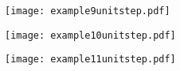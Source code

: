 \documentclass[grid, poker_portrait]{flashcards}
\begin{document}
    \begin{flashcard}{ \begin{dmath*}  \end{dmath*} }
        \texttt{[image: example9unitstep.pdf]}
    \end{flashcard}

    \begin{flashcard}{ \begin{dmath*}  \end{dmath*} }
        \texttt{[image: example10unitstep.pdf]}
    \end{flashcard}

    \begin{flashcard}{ \begin{dmath*}  \end{dmath*} }
        \texttt{[image: example11unitstep.pdf]}
    \end{flashcard}
\end{document}
